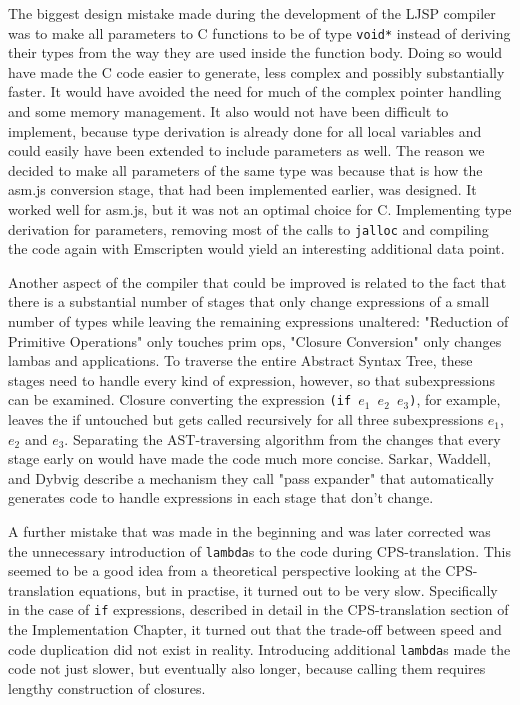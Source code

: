\documentclass[11pt]{report}
\begin{document}
The biggest design mistake made during the development of the LJSP compiler was to make all parameters to C functions to be of type \texttt{void*} instead of deriving their types from the way they are used inside the function body. Doing so would have made the C code easier to generate, less complex and possibly substantially faster. It would have avoided the need for much of the complex pointer handling and some memory management. It also would not have been difficult to implement, because type derivation is already done for all local variables and could easily have been extended to include parameters as well. The reason we decided to make all parameters of the same type was because that is how the asm.js conversion stage, that had been implemented earlier, was designed. It worked well for asm.js, but it was not an optimal choice for C. Implementing type derivation for parameters, removing most of the calls to \texttt{jalloc} and compiling the code again with Emscripten would yield an interesting additional data point.

Another aspect of the compiler that could be improved is related to the fact that there is a substantial number of stages that only change expressions of a small number of types while leaving the remaining expressions unaltered: "Reduction of Primitive Operations" only touches prim ops, "Closure Conversion" only changes lambas and applications. To traverse the entire Abstract Syntax Tree, these stages need to handle every kind of expression, however, so that subexpressions can be examined. Closure converting the expression \texttt{(if $e_1$ $e_2$ $e_3$)}, for example, leaves the if untouched but gets called recursively for all three subexpressions $e_1$, $e_2$ and $e_3$. Separating the AST-traversing algorithm from the changes that every stage early on would have made the code much more concise. Sarkar, Waddell, and Dybvig describe \cite{nanopass} a mechanism they call "pass expander" that automatically generates code to handle expressions in each stage that don't change.


A further mistake that was made in the beginning and was later corrected was the unnecessary introduction of \texttt{lambda}s to the code during CPS-translation. This seemed to be a good idea from a theoretical perspective looking at the CPS-translation equations, but in practise, it turned out to be very slow. Specifically in the case of \texttt{if} expressions, described in detail in the CPS-translation section of the Implementation Chapter, it turned out that the trade-off between speed and code duplication did not exist in reality. Introducing additional \texttt{lambda}s made the code not just slower, but eventually also longer, because calling them requires lengthy construction of closures.
\end{document}

